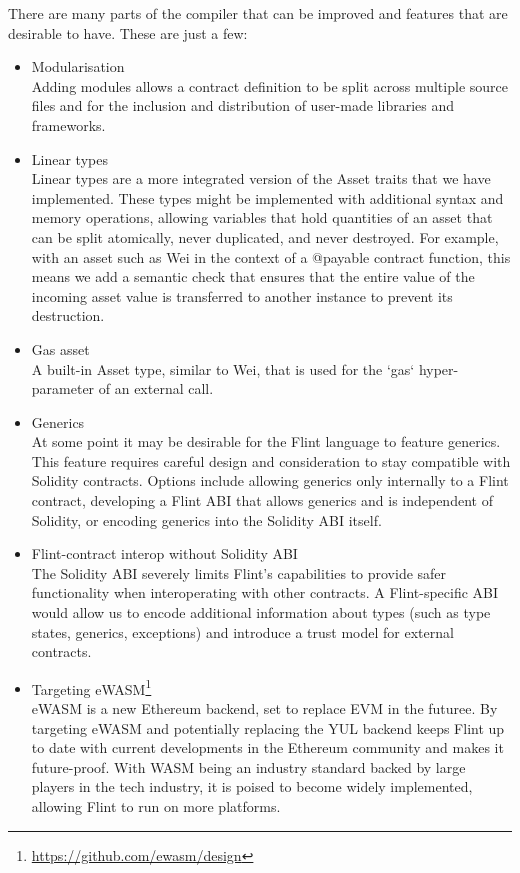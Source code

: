 There are many parts of the compiler that can be improved and features that are desirable to have. These are just a few:

\begin{itemize}
	\item Modularisation\\
Adding modules allows a contract definition to be split across multiple source files and for the inclusion and distribution of user-made libraries and frameworks.
	\item Linear types\\
Linear types are a more integrated version of the Asset traits that we have implemented. These types might be implemented with additional syntax and memory operations, allowing variables that hold quantities of an asset that can be split atomically, never duplicated, and never destroyed. For example, with an asset such as Wei in the context of a @payable contract function, this means we add a semantic check that ensures that the entire value of the incoming asset value is transferred to another instance to prevent its destruction.
	\item Gas asset\\
A built-in Asset type, similar to Wei, that is used for the `gas` hyper-parameter of an external call.
	\item Generics\\
At some point it may be desirable for the Flint language to feature generics. This feature requires careful design and consideration to stay compatible with Solidity contracts. Options include allowing generics only internally to a Flint contract, developing a Flint ABI that allows generics and is independent of Solidity, or encoding generics into the Solidity ABI itself.
	\item Flint-contract interop without Solidity ABI\\
The Solidity ABI severely limits Flint's capabilities to provide safer functionality when interoperating with other contracts. A Flint-specific ABI would allow us to encode additional information about types (such as type states, generics, exceptions) and introduce a trust model for external contracts.
	\item Targeting eWASM\footnote{\url{https://github.com/ewasm/design}}\\
eWASM is a new Ethereum backend, set to replace EVM in the futuree. By targeting eWASM and potentially replacing the YUL backend keeps Flint up to date with current developments in the Ethereum community and makes it future-proof. With WASM being an industry standard backed by large players in the tech industry, it is poised to become widely implemented, allowing Flint to run on more platforms.

\end{itemize}
